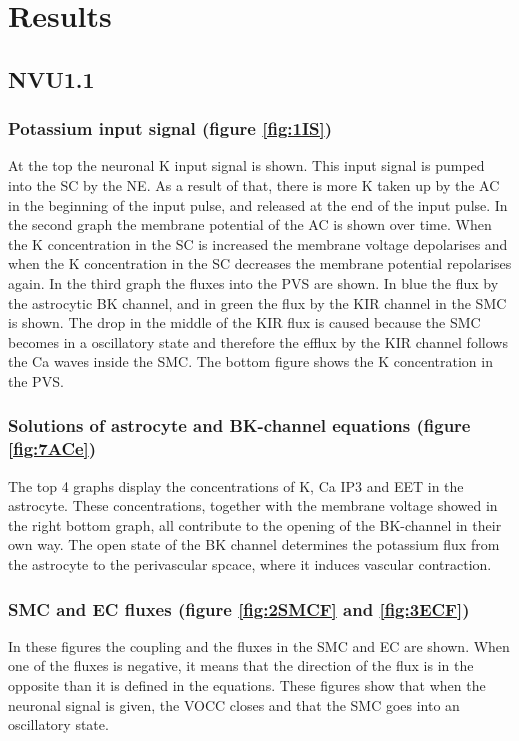 %
	\section{Results}
	\subsection {NVU1.1}
	\subsubsection*{Potassium input signal (figure \ref{fig:1IS})}
	At the top the neuronal \gls{K} input signal is shown. This input signal is pumped into the SC by the \gls{NE}. As a result of that, there is more \gls{K} taken up by the \gls{AC} in the beginning of the input pulse, and released at the end of the input pulse. In the second graph the membrane potential of the AC is shown over time. When the \gls{K} concentration in the SC is increased the membrane voltage depolarises and when the \gls{K} concentration in the SC decreases the membrane potential repolarises again.
	In the third graph the fluxes into the PVS are shown. In blue the flux by the astrocytic BK channel, and in green the flux by the KIR channel in the SMC is shown. The drop in the middle of the KIR flux is caused because the SMC becomes in a oscillatory state and therefore the efflux by the KIR channel follows the \gls{Ca} waves inside the SMC.
	The bottom figure shows the \gls{K} concentration in the PVS.
	
	\subsubsection*{Solutions of astrocyte and BK-channel equations (figure \ref{fig:7ACe})}
	 The top 4 graphs display the concentrations of \gls{K}, \gls{Ca} \gls{IP3} and EET in the astrocyte. These concentrations, together with the membrane voltage showed in the right bottom graph, all contribute to the opening of the BK-channel in their own way. The open state of the BK channel determines the potassium flux from the astrocyte to the perivascular spcace, where it induces vascular contraction.
	
	\subsubsection*{SMC and EC fluxes (figure \ref{fig:2SMCF} and \ref{fig:3ECF})}
	In these figures the coupling and the fluxes in the SMC and EC are shown. When one of the fluxes is negative, it means that the direction of the flux is in the opposite than it is defined in the equations. These figures show that when the neuronal signal is given, the VOCC closes and that the SMC goes into an oscillatory state. 
	
